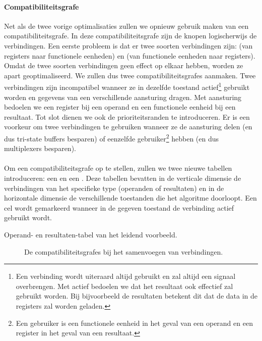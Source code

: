 \paragraph{Compatibiliteitsgrafe}Net als de twee vorige optimalisaties zullen we opnieuw gebruik maken van een compatibiliteitsgrafe. In deze compatibiliteitsgrafe zijn de knopen logischerwijs de verbindingen. Een eerste probleem is dat er twee soorten verbindingen zijn:  (van registers naar functionele eenheden) en  (van functionele eenheden naar registers). Omdat de twee soorten verbindingen geen effect op elkaar hebben, worden ze apart geoptimaliseerd. We zullen dus twee compatibiliteitsgrafes aanmaken. Twee verbindingen zijn incompatibel wanneer ze in dezelfde toestand actief\footnote{Een verbinding wordt uiteraard altijd gebruikt en zal altijd een signaal overbrengen. Met actief bedoelen we dat het resultaat ook effectief zal gebruikt worden. Bij bijvoorbeeld de resultaten betekent dit dat de data in de registers zal worden geladen.} gebruikt worden en gegevens van een verschillende aansturing dragen. Met aansturing bedoelen we een register bij een operand en een functionele eenheid bij een resultaat. Tot slot dienen we ook de prioriteitsranden te introduceren. Er is een voorkeur om twee verbindingen te gebruiken wanneer ze de aansturing delen (en dus tri-state buffers besparen) of eenzelfde gebruiker\footnote{Een gebruiker is een functionele eenheid in het geval van een operand en een register in het geval van een resultaat.} hebben (en dus multiplexers besparen).
\paragraph{}
Om een compatibiliteitsgrafe op te stellen, zullen we twee nieuwe tabellen introduceren: een  en een . Deze tabellen bevatten in de verticale dimensie de verbindingen van het specifieke type (operanden of resultaten) en in de horizontale dimensie de verschillende toestanden die het algoritme doorloopt. Een cel wordt gemarkeerd wanneer in de gegeven toestand de verbinding actief gebruikt wordt.
\begin{table}[hbt]
\centering
{}
\caption{Operand- en resultaten-tabel van het leidend voorbeeld.}
\end{table}
\begin{figure}[hbt]
\centering
{}
\caption{De compatibiliteitsgrafes bij het samenvoegen van verbindingen.}
\end{figure}
